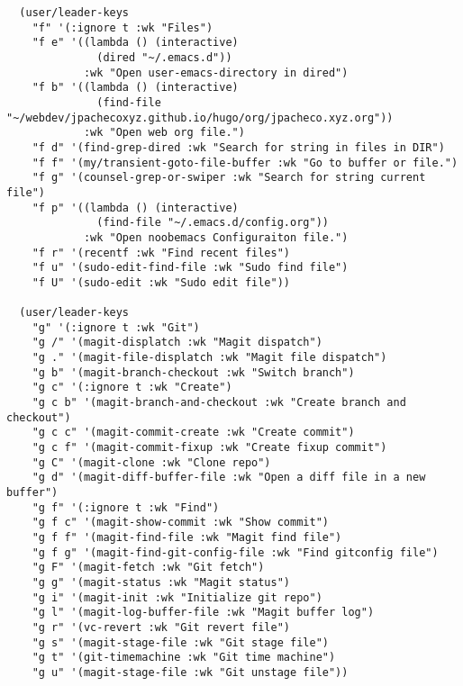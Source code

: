 \documentclass[11pt]{article}
\begin{document}
\begin{verbatim}
  (user/leader-keys
    "f" '(:ignore t :wk "Files")    
    "f e" '((lambda () (interactive)
              (dired "~/.emacs.d")) 
            :wk "Open user-emacs-directory in dired")
    "f b" '((lambda () (interactive)
              (find-file "~/webdev/jpachecoxyz.github.io/hugo/org/jpacheco.xyz.org")) 
            :wk "Open web org file.")
    "f d" '(find-grep-dired :wk "Search for string in files in DIR")
    "f f" '(my/transient-goto-file-buffer :wk "Go to buffer or file.")
    "f g" '(counsel-grep-or-swiper :wk "Search for string current file")
    "f p" '((lambda () (interactive)
              (find-file "~/.emacs.d/config.org")) 
            :wk "Open noobemacs Configuraiton file.")
    "f r" '(recentf :wk "Find recent files")
    "f u" '(sudo-edit-find-file :wk "Sudo find file")
    "f U" '(sudo-edit :wk "Sudo edit file"))

  (user/leader-keys
    "g" '(:ignore t :wk "Git")    
    "g /" '(magit-displatch :wk "Magit dispatch")
    "g ." '(magit-file-displatch :wk "Magit file dispatch")
    "g b" '(magit-branch-checkout :wk "Switch branch")
    "g c" '(:ignore t :wk "Create") 
    "g c b" '(magit-branch-and-checkout :wk "Create branch and checkout")
    "g c c" '(magit-commit-create :wk "Create commit")
    "g c f" '(magit-commit-fixup :wk "Create fixup commit")
    "g C" '(magit-clone :wk "Clone repo")
    "g d" '(magit-diff-buffer-file :wk "Open a diff file in a new buffer")
    "g f" '(:ignore t :wk "Find") 
    "g f c" '(magit-show-commit :wk "Show commit")
    "g f f" '(magit-find-file :wk "Magit find file")
    "g f g" '(magit-find-git-config-file :wk "Find gitconfig file")
    "g F" '(magit-fetch :wk "Git fetch")
    "g g" '(magit-status :wk "Magit status")
    "g i" '(magit-init :wk "Initialize git repo")
    "g l" '(magit-log-buffer-file :wk "Magit buffer log")
    "g r" '(vc-revert :wk "Git revert file")
    "g s" '(magit-stage-file :wk "Git stage file")
    "g t" '(git-timemachine :wk "Git time machine")
    "g u" '(magit-stage-file :wk "Git unstage file"))


\end{verbatim}
\end{document}
